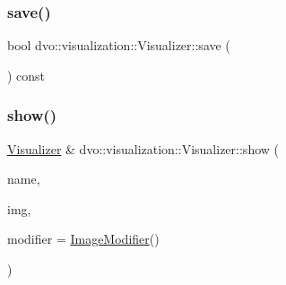\subsubsection{\texorpdfstring{save()}{save()}\hspace{0.1cm}{\footnotesize\ttfamily [2/2]}}
{\footnotesize\ttfamily bool dvo\+::visualization\+::\+Visualizer\+::save (\begin{DoxyParamCaption}{ }\end{DoxyParamCaption}) const}

\mbox{\label{classdvo_1_1visualization_1_1_visualizer_add2fa4993814327d9153aafcda1fea6f}} 
\subsubsection{\texorpdfstring{show()}{show()}\hspace{0.1cm}{\footnotesize\ttfamily [1/4]}}
{\footnotesize\ttfamily \mbox{\hyperlink{classdvo_1_1visualization_1_1_visualizer}{Visualizer}} \& dvo\+::visualization\+::\+Visualizer\+::show (\begin{DoxyParamCaption}\item[{const char $\ast$}]{name,  }\item[{const cv\+::\+Mat\+Expr \&}]{img,  }\item[{\mbox{\hyperlink{classdvo_1_1visualization_1_1_visualizer_ac33e0b53e7ef7be64e3230f6c91084a0}{Image\+Modifier}}}]{modifier = {\ttfamily \mbox{\hyperlink{classdvo_1_1visualization_1_1_visualizer_ac33e0b53e7ef7be64e3230f6c91084a0}{Image\+Modifier}}()} }\end{DoxyParamCaption})}

\mbox{\label{classdvo_1_1visualization_1_1_visualizer_a1dea5a2108f022dfc92ec0eb0aa3a717}} 
